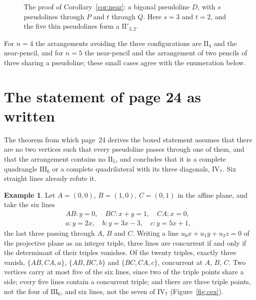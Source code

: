 \documentclass[11pt,a4paper]{amsart}
\theoremstyle{definition}
\newtheorem{example}[theorem]{Example}
\theoremstyle{remark}
\newcommand{\II}[1]{\mathrm{II}_{#1}}
\newcommand{\IIp}{\mathrm{II}'_{3,2}}
\newcommand{\III}{\mathrm{III}_{6}}
\begin{document}
\begin{figure}[ht]
\centering
{}
\caption{The proof of Corollary~\ref{cor:near}: a bigonal pseudoline $D$, with $s$ pseudolines through $P$ and $t$ through $Q$. Here $s = 3$ and $t = 2$, and the five thin pseudolines form a $\IIp$.}\label{fig:cor}
\end{figure}


For $n = 4$ the arrangements avoiding the three configurations are $\II4$ and the near-pencil, and for $n = 5$ the near-pencil and the arrangement of two pencils of three sharing a pseudoline; these small cases agree with the enumeration below.

\section{The statement of page 24 as written}\label{sec:p24}

The theorem from which page~24 derives the boxed statement assumes that there are no two vertices such that every pseudoline passes through one of them, and that the arrangement contains no $\II5$, and concludes that it is a complete quadrangle $\III$ or a complete quadrilateral with its three diagonals, $\mathrm{IV}_7$. Six straight lines already refute it.

\begin{example}\label{ex:p24}
Let $A = (0,0)$, $B = (1,0)$, $C = (0,1)$ in the affine plane, and take the six lines
\[
\begin{gathered}AB\colon y = 0,\quad BC\colon x + y = 1,\quad CA\colon x = 0,\\ a\colon y = 2x,\quad b\colon y = 3x - 3,\quad c\colon y = 5x + 1,\end{gathered}
\]
the last three passing through $A$, $B$ and $C$. Writing a line $u_0x + u_1y + u_2z = 0$ of the projective plane as an integer triple, three lines are concurrent if and only if the determinant of their triples vanishes. Of the twenty triples, exactly three vanish, $\{AB, CA, a\}$, $\{AB, BC, b\}$ and $\{BC, CA, c\}$, concurrent at $A$, $B$, $C$. Two vertices carry at most five of the six lines, since two of the triple points share a side; every five lines contain a concurrent triple; and there are three triple points, not the four of $\III$, and six lines, not the seven of $\mathrm{IV}_7$ (Figure~\ref{fig:cex}).
\end{example}
\end{document}

